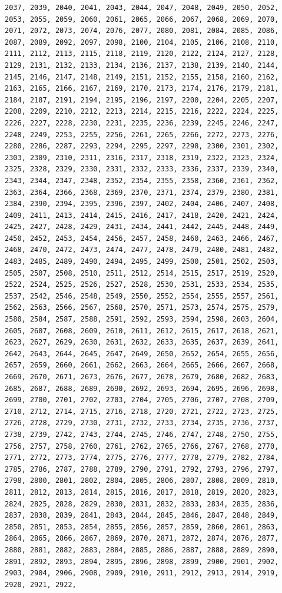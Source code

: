 \documentclass[a4paper, nobind]{templates/ociamthesis}
\begin{document}
\begin{verbatim}
2037, 2039, 2040, 2041, 2043, 2044, 2047, 2048, 2049, 2050, 2052, 2053, 2055, 2059, 2060, 2061, 2065, 2066, 2067, 2068, 2069, 2070, 2071, 2072, 2073, 2074, 2076, 2077, 2080, 2081, 2084, 2085, 2086, 2087, 2089, 2092, 2097, 2098, 2100, 2104, 2105, 2106, 2108, 2110, 2111, 2112, 2113, 2115, 2118, 2119, 2120, 2122, 2124, 2127, 2128, 2129, 2131, 2132, 2133, 2134, 2136, 2137, 2138, 2139, 2140, 2144, 2145, 2146, 2147, 2148, 2149, 2151, 2152, 2155, 2158, 2160, 2162, 2163, 2165, 2166, 2167, 2169, 2170, 2173, 2174, 2176, 2179, 2181, 2184, 2187, 2191, 2194, 2195, 2196, 2197, 2200, 2204, 2205, 2207, 2208, 2209, 2210, 2212, 2213, 2214, 2215, 2216, 2222, 2224, 2225, 2226, 2227, 2228, 2230, 2231, 2235, 2236, 2239, 2245, 2246, 2247, 2248, 2249, 2253, 2255, 2256, 2261, 2265, 2266, 2272, 2273, 2276, 2280, 2286, 2287, 2293, 2294, 2295, 2297, 2298, 2300, 2301, 2302, 2303, 2309, 2310, 2311, 2316, 2317, 2318, 2319, 2322, 2323, 2324, 2325, 2328, 2329, 2330, 2331, 2332, 2333, 2336, 2337, 2339, 2340, 2343, 2344, 2347, 2348, 2352, 2354, 2355, 2358, 2360, 2361, 2362, 2363, 2364, 2366, 2368, 2369, 2370, 2371, 2374, 2379, 2380, 2381, 2384, 2390, 2394, 2395, 2396, 2397, 2402, 2404, 2406, 2407, 2408, 2409, 2411, 2413, 2414, 2415, 2416, 2417, 2418, 2420, 2421, 2424, 2425, 2427, 2428, 2429, 2431, 2434, 2441, 2442, 2445, 2448, 2449, 2450, 2452, 2453, 2454, 2456, 2457, 2458, 2460, 2463, 2466, 2467, 2468, 2470, 2472, 2473, 2474, 2477, 2478, 2479, 2480, 2481, 2482, 2483, 2485, 2489, 2490, 2494, 2495, 2499, 2500, 2501, 2502, 2503, 2505, 2507, 2508, 2510, 2511, 2512, 2514, 2515, 2517, 2519, 2520, 2522, 2524, 2525, 2526, 2527, 2528, 2530, 2531, 2533, 2534, 2535, 2537, 2542, 2546, 2548, 2549, 2550, 2552, 2554, 2555, 2557, 2561, 2562, 2563, 2566, 2567, 2568, 2570, 2571, 2573, 2574, 2575, 2579, 2580, 2584, 2587, 2588, 2591, 2592, 2593, 2594, 2598, 2603, 2604, 2605, 2607, 2608, 2609, 2610, 2611, 2612, 2615, 2617, 2618, 2621, 2623, 2627, 2629, 2630, 2631, 2632, 2633, 2635, 2637, 2639, 2641, 2642, 2643, 2644, 2645, 2647, 2649, 2650, 2652, 2654, 2655, 2656, 2657, 2659, 2660, 2661, 2662, 2663, 2664, 2665, 2666, 2667, 2668, 2669, 2670, 2671, 2673, 2676, 2677, 2678, 2679, 2680, 2682, 2683, 2685, 2687, 2688, 2689, 2690, 2692, 2693, 2694, 2695, 2696, 2698, 2699, 2700, 2701, 2702, 2703, 2704, 2705, 2706, 2707, 2708, 2709, 2710, 2712, 2714, 2715, 2716, 2718, 2720, 2721, 2722, 2723, 2725, 2726, 2728, 2729, 2730, 2731, 2732, 2733, 2734, 2735, 2736, 2737, 2738, 2739, 2742, 2743, 2744, 2745, 2746, 2747, 2748, 2750, 2755, 2756, 2757, 2758, 2760, 2761, 2762, 2765, 2766, 2767, 2768, 2770, 2771, 2772, 2773, 2774, 2775, 2776, 2777, 2778, 2779, 2782, 2784, 2785, 2786, 2787, 2788, 2789, 2790, 2791, 2792, 2793, 2796, 2797, 2798, 2800, 2801, 2802, 2804, 2805, 2806, 2807, 2808, 2809, 2810, 2811, 2812, 2813, 2814, 2815, 2816, 2817, 2818, 2819, 2820, 2823, 2824, 2825, 2828, 2829, 2830, 2831, 2832, 2833, 2834, 2835, 2836, 2837, 2838, 2839, 2841, 2843, 2844, 2845, 2846, 2847, 2848, 2849, 2850, 2851, 2853, 2854, 2855, 2856, 2857, 2859, 2860, 2861, 2863, 2864, 2865, 2866, 2867, 2869, 2870, 2871, 2872, 2874, 2876, 2877, 2880, 2881, 2882, 2883, 2884, 2885, 2886, 2887, 2888, 2889, 2890, 2891, 2892, 2893, 2894, 2895, 2896, 2898, 2899, 2900, 2901, 2902, 2903, 2904, 2906, 2908, 2909, 2910, 2911, 2912, 2913, 2914, 2919, 2920, 2921, 2922, 
\end{verbatim}
\end{document}
